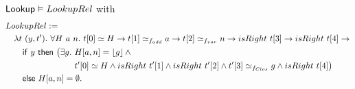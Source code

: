 \begin{lemma}
  \label{lem:Lookup_Realise}
  $\mathsf{Lookup} \mathrel{\vDash} LookupRel$
  with
  \small
  \begin{alignat*}{1}
    & LookupRel := \\
    &\quad \lambda t~(y, t').~\forall H~a~n.~ t[0] \simeq H \rightarrow t[1] \simeq_{f_{add}} a \rightarrow t[2] \simeq_{f_{var}} n \rightarrow isRight~t[3] \rightarrow isRight~t[4] \rightarrow \\
    &\quad\quad \MS{if}~y~\MS{then}~\bigl(\exists g.~H[a,n] = \Some{g} \land \\
    &\quad\quad \phantom{\MS{if}~y~\MS{then}~\bigl(\exists g.~} t'[0] \simeq H \land isRight~t'[1] \land isRight~t'[2] \land t'[3] \simeq_{f_{Clos}} g \land isRight~t[4]\bigr) \\
    &\quad\quad \MS{else}~ H[a,n] = \None.
\end{alignat*}
\end{lemma}





